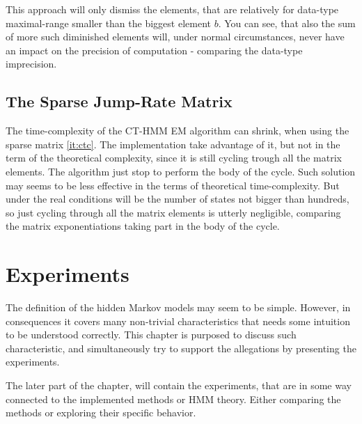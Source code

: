 \documentclass[thesis=M,english]{FITthesis}[2012/10/20]
\begin{document}
This approach will only dismiss the elements, that are relatively for data-type maximal-range smaller than the biggest element $b$. You can see, that also the sum of more such diminished elements will, under normal circumstances, never have an impact on the precision of computation - comparing the data-type imprecision.     


\section{The Sparse Jump-Rate Matrix}

The time-complexity of the CT-HMM EM algorithm can shrink, when using the sparse matrix \ref{it:ctc}. The implementation take advantage of it, but not in the term of the theoretical complexity, since it is still cycling trough all the matrix elements. The algorithm just stop to perform the body of the cycle. Such solution may seems to be less effective in the terms of theoretical time-complexity. But under the real conditions will be the number of states not bigger than hundreds, so just cycling through all the matrix elements is utterly negligible, comparing the matrix exponentiations taking part in the body of the cycle.   
 
\chapter{Experiments}

The definition of the hidden Markov models may seem to be simple. However, in consequences it covers many non-trivial characteristics that needs some intuition to be understood correctly. This chapter is purposed to discuss such characteristic, and simultaneously try to support the allegations by presenting the experiments.

The later part of the chapter, will contain the experiments, that are in some way connected to the implemented methods or HMM theory. Either comparing the methods or exploring their specific behavior.       
\end{document}
